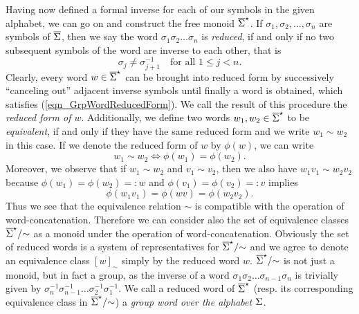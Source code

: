 Having now defined a formal inverse for each of our symbols in the given alphabet, we can go on and construct the free monoid ${\overline{\Sigma}}^{\star}$. If $\sigma_1, \sigma_2, \dots, \sigma_n$ are symbols of $\overline{\Sigma}$, then we say the word $\sigma_1 \sigma_2 \dots \sigma_n$ is \emph{reduced}, if and only if no two subsequent symbols of the word are inverse to each other, that is
\begin{equation}
\label{eqn_GrpWordReducedForm}
 \sigma_j \ne \sigma_{j+1}^{-1} \quad \text{for all } 1 \le j < n.
\end{equation}
Clearly, every word $w \in {\overline{\Sigma}}^{\star}$ can be brought into reduced form by successively ``canceling out'' adjacent inverse symbols until finally a word is obtained, which satisfies (\ref{eqn_GrpWordReducedForm}). We call the result of this procedure the \emph{reduced form of $w$}. Additionally, we define two words $w_1, w_2 \in {\overline{\Sigma}}^{\star}$ to be \emph{equivalent}, if and only if they have the same reduced form and we write $w_1 \sim w_2$ in this case. If we denote the reduced form of $w$ by $\phi(w)$, we can write
\begin{equation*}
w_1 \sim w_2 \Leftrightarrow \phi(w_1) = \phi(w_2).
\end{equation*}
Moreover, we observe that if $w_1 \sim w_2$ and $v_1 \sim v_2$, then we also have $w_1 v_1 \sim w_2 v_2$ because $\phi(w_1) = \phi(w_2) =: w$ and $\phi(v_1) = \phi(v_2) =: v$ implies 
\begin{equation*}
\phi(w_1 v_1) = \phi(w v) = \phi(w_2 v_2).
\end{equation*}
Thus we see that the equivalence relation $\sim$ is compatible with the operation of word-concatenation. Therefore we can consider also the set of equivalence classes ${\overline{\Sigma}}^{\star}/{\sim}$ as a monoid under the operation of word-concatenation. Obviously the set of reduced words is a system of representatives for ${\overline{\Sigma}}^{\star}/{\sim}$ and we agree to denote an equivalence class $[w]_{\sim}$ simply by the reduced word $w$. ${\overline{\Sigma}}^{\star}/{\sim}$ is not just a monoid, but in fact a group, as the inverse of a word $\sigma_1 \sigma_2 \dots \sigma_{n-1} \sigma_n$ is trivially given by $\sigma_n^{-1} \sigma_{n-1}^{-1} \dots \sigma_2^{-1} \sigma_1^{-1}$. We call a reduced word of ${\overline{\Sigma}}^{\star}$ (resp. its corresponding equivalence class in ${\overline{\Sigma}}^{\star}/{\sim}$) a \emph{group word over the alphabet $\Sigma$}.

